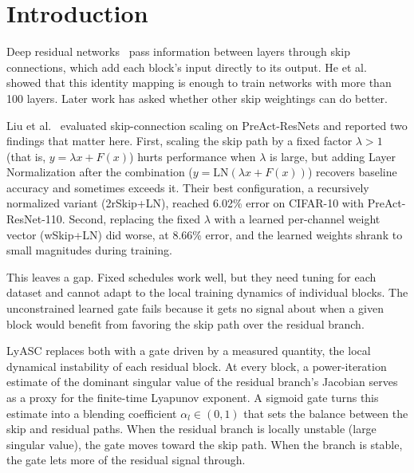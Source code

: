 \documentclass[conference,10pt]{IEEEtran}
\begin{document}
\section{Introduction}

Deep residual networks~\cite{he2016deep} pass information between
layers through skip connections, which add each block's input directly
to its output. He et al.~\cite{he2016identity} showed that this identity
mapping is enough to train networks with more than 100 layers. Later
work has asked whether other skip weightings can do better.

Liu et al.~\cite{liu2021rethinking} evaluated skip-connection scaling on
PreAct-ResNets and reported two findings that matter here. First,
scaling the skip path by a fixed factor $\lambda > 1$ (that is,
$y = \lambda x + F(x)$) hurts performance when $\lambda$ is large, but
adding Layer Normalization after the combination
($y = \text{LN}(\lambda x + F(x))$) recovers baseline accuracy and
sometimes exceeds it. Their best configuration, a recursively normalized
variant (2rSkip+LN), reached 6.02\% error on CIFAR-10 with
PreAct-ResNet-110. Second, replacing the fixed $\lambda$ with a learned
per-channel weight vector (wSkip+LN) did worse, at 8.66\% error, and the
learned weights shrank to small magnitudes during training.

This leaves a gap. Fixed schedules work well, but they need tuning for
each dataset and cannot adapt to the local training dynamics of
individual blocks. The unconstrained learned gate fails because it gets
no signal about when a given block would benefit from favoring the skip
path over the residual branch.

LyASC replaces both with a gate driven by a measured quantity, the local
dynamical instability of each residual block. At every block, a
power-iteration estimate of the dominant singular value of the residual
branch's Jacobian serves as a proxy for the finite-time Lyapunov
exponent. A sigmoid gate turns this estimate into a blending coefficient
$\alpha_l \in (0, 1)$ that sets the balance between the skip and
residual paths. When the residual branch is locally unstable (large
singular value), the gate moves toward the skip path. When the branch is
stable, the gate lets more of the residual signal through.
\end{document}

